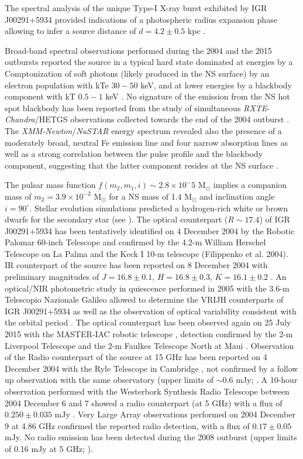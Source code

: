 \documentclass[graybox]{svmult}
\def \chandra {{\em Chandra\xspace}}
\def \xmm {{\em XMM-Newton\xspace}}
\def \rxte {{\em RXTE\xspace}}
\def \nustar{{\em NuSTAR\xspace}}
\begin{document}
The spectral analysis of the unique Type-I X-ray burst exhibited by IGR J00291+5934 provided indications of a photospheric radius expansion phase allowing to infer a source distance of $d = 4.2\pm0.5$ kpc \cite{Bozzo2015,DeFalco2017}.


Broad-band spectral observations performed during the 2004 and the 2015 outbursts reported the source in a typical hard state dominated at energies by a Comptonization of soft photons (likely produced in the NS surface) by an electron population with kTe $30-50$ keV, and at lower energies by a blackbody component with kT $0.5-1$ keV \cite{Falanga2005b,Sanna2017d}. No signature of the emission from the NS hot spot blackbody has been reported from the study of simultaneous \rxte{}-\chandra{}/HETGS observations collected towards the end of the 2004 outburst \cite{Paizis2005}. The \xmm{}/\nustar{} energy spectrum revealed also the presence of a moderately broad, neutral Fe emission line and four narrow absorption lines as well as a strong correlation between the pulse profile and the blackbody component, suggesting that the latter component resides at the NS surface \cite{Sanna2017d}.

The pulsar mass function $f(m_2,m_1,i)\sim 2.8\times 10^-5$ M$_\odot$ implies a companion mass of $m_2=3.9\times 10^{-2}$ M$_\odot$ for a NS mass of 1.4 M$_\odot$ and inclination angle $i=90^\circ$. Stellar evolution simulations predicted a hydrogen-rich white or brown dwarfs for the secondary star (see \cite{Bildsten2001}). The optical counterpart ($R\sim17.4$) of IGR J00291+5934 has been tentatively identified on 4 December 2004 by the Robotic Palomar 60-inch Telescope \cite{Fox2004} and confirmed by the 4.2-m William Herschel Telescope on La Palma \cite{Roelofs2004} and the Keck I 10-m telescope (Filippenko et al. 2004). IR counterpart of the source has been reported on 8 December 2004 with preliminary magnitudes of $J=16.8\pm0.1$, $H=16.8\pm0.3$, $K=16.1\pm 0.2$ \cite{Steeghs2004}. An optical/NIR photometric study in quiescence performed in 2005 with the 3.6-m Telescopio Nazionale Galileo allowed to determine the VRIJH counterparts of IGR J00291+5934 as well as the observation of optical variability consistent with the orbital period \cite{DAvanzo2007}. The optical counterpart has been observed again on 25 July 2015 with the MASTER-IAC robotic telescope \cite{Rebolo2015b}, detection confirmed by the 2-m Liverpool Telescope \cite{Kopac2015} and the 2-m Faulkes Telescope North at Maui \cite{Russell2015}. Observation of the Radio counterpart of the source at 15 GHz has been reported on 4 December 2004 with the Ryle Telescope in Cambridge \cite{Pooley2004}, not confirmed by a follow up observation with the same observatory (upper limits of $\sim0.6$ mJy; \cite{Fender2004}. A 10-hour observation performed with the Westerbork Synthesis Radio Telescope between 2004 December 6 and 7 showed a radio counterpart (at 5 GHz) with a flux of $0.250\pm0.035$ mJy \cite{Fender2004}. Very Large Array observations performed on 2004 December 9 at 4.86 GHz confirmed the reported radio detection, with a flux of $0.17\pm0.05$ mJy. No radio emission has been detected during the 2008 outburst (upper limits of 0.16 mJy at 5 GHz; \cite{Linares2008}). 
\end{document}

